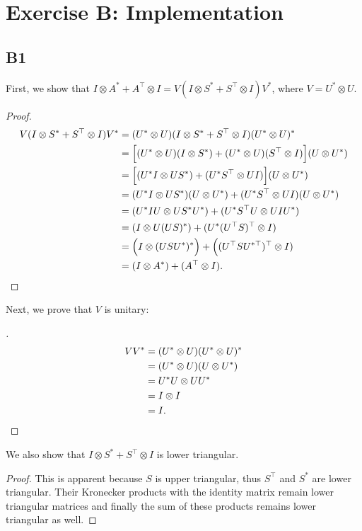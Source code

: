 \documentclass[11pt]{article}
\newcommand{\kp}{\otimes}
\begin{document}
\section*{Exercise B: Implementation}
\subsection*{B1}
First, we show that $I \kp A^{*} + A^\top \kp I = V (I \kp S^{*} + S^\top \kp I) V^{*}$, where \(V = U^* \kp U\).

\begin{proof}
\begin{align*}
   V (I \kp S^{*} + S^\top \kp I) V^{*}
   &= (U^{*} \kp U) (I \kp S^{*} + S^\top \kp I) (U^{*} \kp U)^{*} \\
   &= \Big[(U^{*} \kp U) (I \kp S^{*}) + (U^{*} \kp U) (S^\top \kp I)\Big] (U \kp U^{*}) \\
   &= \Big[(U^{*} I \kp U S^{*}) + (U^{*}S^\top \kp U I)\Big] (U \kp U^{*}) \\
   &= (U^{*} I \kp U S^{*}) (U \kp U^{*}) + (U^{*}S^\top \kp U I) (U \kp U^{*}) \\
   &= (U^{*} I U \kp U S^{*} U^{*}) + (U^{*}S^\top U \kp U I U^{*}) \\
   &= (I \kp U (U S)^{*} ) + (U^{*} (U^\top S)^\top \kp I) \\
   &= \Big(I \kp (U S U^{*})^{*}\Big) + \Big((U^\top S U^{*\top})^\top \kp I) \\
   &= (I \kp A^{*} ) + (A^\top \kp I).\qedhere
\end{align*}
\end{proof}

Next, we prove that \(V\) is unitary:
\begin{proof}[\leavevmode]
\begin{align*}
   V V^{*} &= (U^{*} \kp U) (U^{*} \kp U)^{*} \\
   &= (U^{*} \kp U) (U \kp U^{*}) \\
   &= U^{*} U \kp U U^{*} \\
   &= I \kp I \\
   &= I.\qedhere
\end{align*}
\end{proof}

We also show that $I \kp S^{*} + S^\top \kp I$ is lower triangular.
\begin{proof}
	This is apparent because \(S\) is upper triangular, thus $S^\top$ and $S^{*}$ are lower triangular.
	Their Kronecker products with the identity matrix remain lower triangular matrices and finally the sum of these products remains lower triangular as well.
\end{proof}
\end{document}
